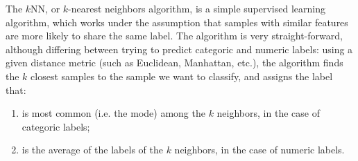 \documentclass[12pt]{article}
\begin{document}
The $k$NN, or $k$-nearest neighbors algorithm, is a simple supervised learning algorithm,
which works under the assumption that samples with similar features are more likely to
share the same label. The algorithm is very straight-forward, although differing
between trying to predict categoric and numeric labels: using a given distance
metric (such as Euclidean, Manhattan, etc.), the algorithm finds the $k$ closest samples to
the sample we want to classify, and assigns the label that:

\begin{enumerate}
  \item is most common (i.e. the mode) among the $k$ neighbors, in the case of categoric labels;
  \item is the average of the labels of the $k$ neighbors, in the case of numeric labels.
\end{enumerate}
\end{document}
